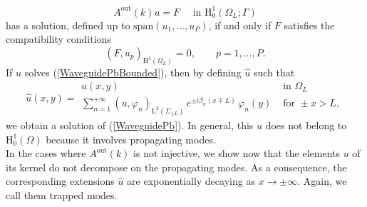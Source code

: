 \documentclass[11pt,a4paper]{report}
\newcommand{\dsp}{\displaystyle}
\newcommand{\Om}{\Omega}
\newcommand{\mrm}[1]{\mathrm{#1}}
\newcommand{\mL}{\mrm{L}}
\newcommand{\mH}{\mrm{H}}
\begin{document}
\[
A^{\mrm{out}}(k)u=F\quad\mbox{ in }\mH^1_0(\Om_L;\Gamma)
\]
has a solution, defined up to $\mrm{span}(u_1,\dots,u_P)$, if and only if $F$ satisfies the compatibility conditions 
\begin{equation}\label{PbCompa1Bis}
(F,u_p)_{\mH^1(\Om_L)}=0,\qquad p=1,\dots,P.
\end{equation}
If $u$ solves (\ref{WaveguidePbBounded}), then by defining $\hat{u}$ such that 
\begin{equation}\label{defExten}
\hat{u}(x,y)=\begin{array}{|ll}
u(x,y) & \mbox{ in }\Om_L \\[3pt]
\dsp\sum_{n=1}^{+\infty} (u,\varphi_n)_{\mL^2(\Sigma_{\pm L})}\,e^{\pm i\beta_n (x\mp L)}\,\varphi_n(y) & \mbox{ for }\pm x>L,
\end{array}
\end{equation}
we obtain a solution of (\ref{WaveguidePb}). In general, this $\hat{u}$ does not belong to $\mH^1_0(\Om)$ because it involves propagating modes.\\
\newline
In the cases where $A^{\mrm{out}}(k)$ is not injective, we show now that the elements $u$ of its kernel do not decompose on the propagating modes. As a consequence, the corresponding extensions $\hat{u}$ are exponentially decaying as $x\to\pm\infty$. Again, we call them trapped modes. 
\end{document}
